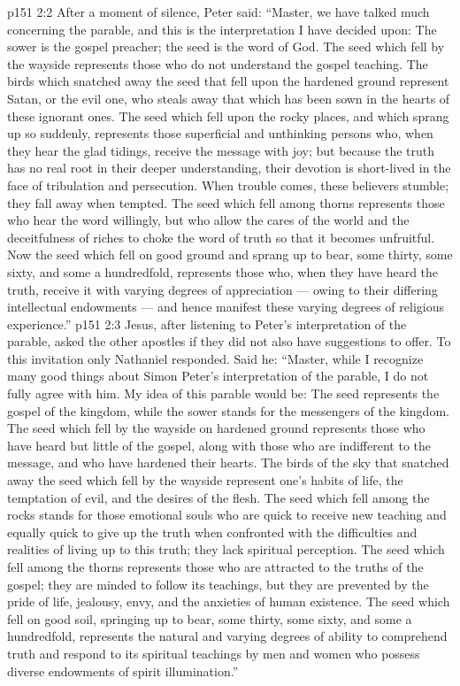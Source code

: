\vs p151 2:2 After a moment of silence, Peter said: “Master, we have talked much concerning the parable, and this is the interpretation I have decided upon: The sower is the gospel preacher; the seed is the word of God. The seed which fell by the wayside represents those who do not understand the gospel teaching. The birds which snatched away the seed that fell upon the hardened ground represent Satan, or the evil one, who steals away that which has been sown in the hearts of these ignorant ones. The seed which fell upon the rocky places, and which sprang up so suddenly, represents those superficial and unthinking persons who, when they hear the glad tidings, receive the message with joy; but because the truth has no real root in their deeper understanding, their devotion is short\hyp{}lived in the face of tribulation and persecution. When trouble comes, these believers stumble; they fall away when tempted. The seed which fell among thorns represents those who hear the word willingly, but who allow the cares of the world and the deceitfulness of riches to choke the word of truth so that it becomes unfruitful. Now the seed which fell on good ground and sprang up to bear, some thirty, some sixty, and some a hundredfold, represents those who, when they have heard the truth, receive it with varying degrees of appreciation --- owing to their differing intellectual endowments --- and hence manifest these varying degrees of religious experience.”
\vs p151 2:3 Jesus, after listening to Peter’s interpretation of the parable, asked the other apostles if they did not also have suggestions to offer. To this invitation only Nathaniel responded. Said he: “Master, while I recognize many good things about Simon Peter’s interpretation of the parable, I do not fully agree with him. My idea of this parable would be: The seed represents the gospel of the kingdom, while the sower stands for the messengers of the kingdom. The seed which fell by the wayside on hardened ground represents those who have heard but little of the gospel, along with those who are indifferent to the message, and who have hardened their hearts. The birds of the sky that snatched away the seed which fell by the wayside represent one’s habits of life, the temptation of evil, and the desires of the flesh. The seed which fell among the rocks stands for those emotional souls who are quick to receive new teaching and equally quick to give up the truth when confronted with the difficulties and realities of living up to this truth; they lack spiritual perception. The seed which fell among the thorns represents those who are attracted to the truths of the gospel; they are minded to follow its teachings, but they are prevented by the pride of life, jealousy, envy, and the anxieties of human existence. The seed which fell on good soil, springing up to bear, some thirty, some sixty, and some a hundredfold, represents the natural and varying degrees of ability to comprehend truth and respond to its spiritual teachings by men and women who possess diverse endowments of spirit illumination.”
